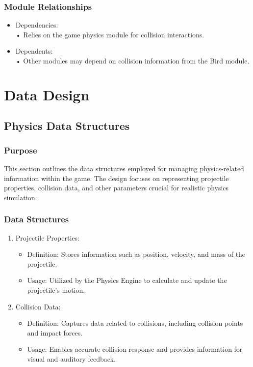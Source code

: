 \documentclass[12pt, titlepage]{article}
\begin{document}
\subsubsection{Module Relationships}
\begin{itemize}
    \item Dependencies:\\
    •	Relies on the game physics module for collision interactions.
    \item Dependents: \\
    •	Other modules may depend on collision information from the Bird module.
\end{itemize}

\section{Data Design}
\subsection{Physics Data Structures}
\subsubsection{Purpose}
	This section outlines the data structures employed for managing physics-related information within the game. The design focuses on representing projectile properties, collision data, and other parameters crucial for realistic physics simulation.
\subsubsection{ Data Structures}
\begin{enumerate}
    \item Projectile Properties:
    \begin{itemize}
        \item Definition: Stores information such as position, velocity, and mass of the projectile.
        \item Usage: Utilized by the Physics Engine to calculate and update the projectile's motion.
    \end{itemize}
    \item Collision Data:
        \begin{itemize}
            \item Definition: Captures data related to collisions, including collision points and impact forces.
            \item Usage: Enables accurate collision response and provides information for visual and auditory feedback.
        \end{itemize}
\end{enumerate}
\end{document}
